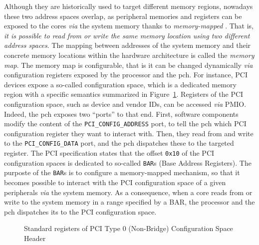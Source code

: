 Although they are historically used to target different memory regions, nowadays
these two address spaces overlap, as peripheral memories and registers can be
exposed to the cores \emph{via} the system memory thanks to \emph{memory-mapped}
\IOs.
%
That is, \emph{it is possible to read from or write the same memory location
  using two different address spaces}.
%
%
%
The mapping between addresses of the system memory and their concrete memory
locations within the hardware architecture is called the \emph{memory map}.
%
The memory map is configurable, that is it can be changed dynamically \emph{via}
configuration registers exposed by the processor and the \ac{pch}.
%
For instance, PCI   devices expose a so-called configuration space, which is a
dedicated memory region with a specific semantics summarized in
Figure~\ref{fig:usecase:pciconfig}.
%
Registers of the PCI configuration space, such as device and vendor IDs, can be
accessed \emph{via} PMIO.
%
Indeed, the \ac{pch} exposes two ``ports'' to that end.
%
First, software components modify the content of the
\texttt{PCI\_CONFIG\_ADDRESS} port, to tell the \ac{pch} which PCI configuration
register they want to interact with.
%
Then, they read from and write to the \texttt{PCI\_CONFIG\_DATA} port, and the
\ac{pch} dispatches these \IO to the targeted register.
%
The PCI specification states that the offset \texttt{0x10} of the PCI
configuration spaces is dedicated to so-called \texttt{BAR}s (Base Address
Registers).
%
The purposte of the \texttt{BAR}s is to configure a memory-mapped mechanism, so
that it becomes possible to interact with the PCI configuration space of a given
peripherals \emph{via} the system memory.
%
As a consequence, when a core reads from or write to the system memory in a
range specified by a BAR, the processor and the \ac{pch}  dispatches its \IOs to
the PCI configuration space.

\begin{figure}
  \begin{center}
    \def\svgwidth{0.8\textwidth} \resizebox{0.6\textwidth}{!}{%
      }
  \end{center}
  \caption{Standard registers of PCI Type 0 (Non-Bridge) Configuration Space
    Header}
  \label{fig:usecase:pciconfig}
\end{figure}


